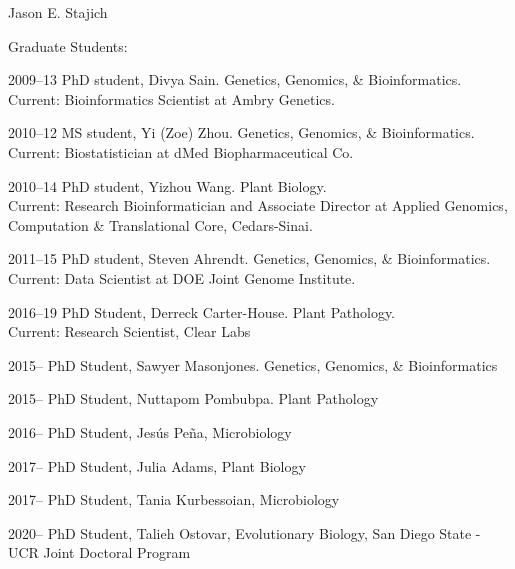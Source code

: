 \documentclass[10pt]{article}
\begin{document}
\begin{cv}{\centerline{Jason E. Stajich}}

\begin{cvlistcompact}{Graduate Students:}
\item [2009--13] PhD student, Divya Sain. Genetics, Genomics, \&
  Bioinformatics. \\ Current: Bioinformatics Scientist at Ambry Genetics.
\item [2010--12] MS student, Yi (Zoe) Zhou. Genetics, Genomics, \&
  Bioinformatics. \\ Current: Biostatistician at dMed Biopharmaceutical Co.
\item [2010--14] PhD student, Yizhou Wang. Plant Biology. \\ Current:
  Research Bioinformatician and Associate Director at Applied Genomics, Computation \& Translational Core, Cedars-Sinai.
\item [2011--15] PhD student, Steven Ahrendt. Genetics, Genomics, \&
  Bioinformatics. \\ Current: Data Scientist at DOE Joint Genome Institute.
\item [2016--19] PhD Student, Derreck Carter-House. Plant Pathology. \\ Current: Research Scientist, Clear Labs
\item [2015--] PhD Student, Sawyer Masonjones. Genetics, Genomics, \&
  Bioinformatics
\item [2015--] PhD Student, Nuttapom Pombubpa. Plant Pathology
\item [2016--] PhD Student, Jes\'{u}s Pe\~{n}a, Microbiology
\item [2017--] PhD Student, Julia Adams, Plant Biology
\item [2017--] PhD Student, Tania Kurbessoian, Microbiology
\item [2020--] PhD Student, Talieh Ostovar, Evolutionary Biology, San Diego State - UCR Joint Doctoral Program


\end{cvlistcompact}
\end{cv}
\end{document}
